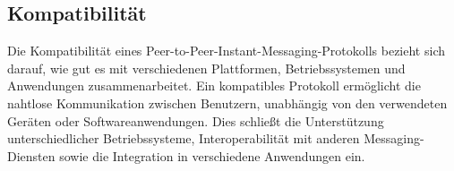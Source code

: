\subsection{Kompatibilität}


Die Kompatibilität eines Peer-to-Peer-Instant-Messaging-Protokolls bezieht sich darauf, wie gut es mit verschiedenen Plattformen, Betriebssystemen und Anwendungen zusammenarbeitet. Ein kompatibles Protokoll ermöglicht die nahtlose Kommunikation zwischen Benutzern, unabhängig von den verwendeten Geräten oder Softwareanwendungen. Dies schließt die Unterstützung unterschiedlicher Betriebssysteme, Interoperabilität mit anderen Messaging-Diensten sowie die Integration in verschiedene Anwendungen ein. 